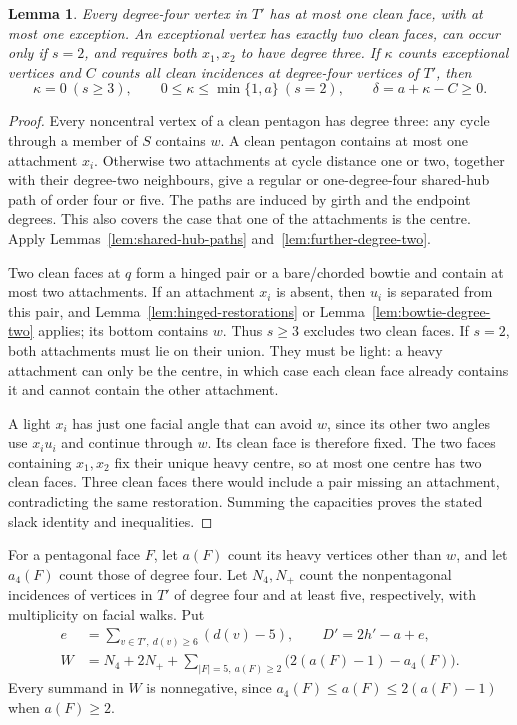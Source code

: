 \documentclass[11pt]{article}
\newtheorem{lemma}[theorem]{Lemma}
\theoremstyle{remark}
\numberwithin{equation}{section}
\numberwithin{table}{section}
\begin{document}
\begin{lemma}\label{lem:degree-two-clean-capacity}
Every degree-four vertex in $T'$ has at most one clean face, with
at most one exception. An exceptional vertex has exactly two clean
faces, can occur only if $s=2$, and requires both $x_1,x_2$ to have
degree three. If $\kappa$ counts exceptional vertices and $C$ counts
all clean incidences at degree-four vertices of $T'$, then
\begin{equation}\label{eq:degree-two-clean-slack}
 \kappa=0\ (s\ge3),\qquad 0\le\kappa\le\min\{1,a\}\ (s=2),\qquad
 \delta=a+\kappa-C\ge0.
\end{equation}
\end{lemma}
\begin{proof}
Every noncentral vertex of a clean pentagon has degree three: any
cycle through a member of $S$ contains $w$. A clean pentagon contains
at most one attachment $x_i$. Otherwise two attachments at cycle
distance one or two, together with their degree-two neighbours, give
a regular or one-degree-four shared-hub path of order four or five.
The paths are induced by girth and the endpoint degrees. This also
covers the case that one of the attachments is the centre. Apply
Lemmas~\ref{lem:shared-hub-paths} and~\ref{lem:further-degree-two}.

Two clean faces at $q$ form a hinged pair or a bare/chorded bowtie
and contain at most two attachments. If an attachment $x_i$ is absent,
then $u_i$ is separated from this pair, and
Lemma~\ref{lem:hinged-restorations} or
Lemma~\ref{lem:bowtie-degree-two} applies; its bottom contains $w$.
Thus $s\ge3$ excludes two clean faces. If $s=2$, both attachments
must lie on their union. They must be light: a heavy attachment can
only be the centre, in which case each clean face already contains
it and cannot contain the other attachment.

A light $x_i$ has just one facial angle that can avoid $w$, since its
other two angles use $x_i u_i$ and continue through $w$. Its clean
face is therefore fixed. The two faces containing $x_1,x_2$ fix their
unique heavy centre, so at most one centre has two clean faces. Three
clean faces there would include a pair missing an attachment,
contradicting the same restoration. Summing the capacities proves
the stated slack identity and inequalities.
\end{proof}

For a pentagonal face $F$, let $a(F)$ count its heavy vertices other
than $w$, and let $a_4(F)$ count those of degree four. Let $N_4,N_+$
count the nonpentagonal incidences of vertices in $T'$ of degree four
and at least five, respectively, with multiplicity on facial walks.
Put
\begin{align}
 e&=\sum_{v\in T',\ d(v)\ge6}(d(v)-5),\qquad
 D'=2h'-a+e,\label{eq:degree-two-degree-split}\\
 W&=N_4+2N_+
   +\sum_{|F|=5,\ a(F)\ge2}\bigl(2(a(F)-1)-a_4(F)\bigr).
 \label{eq:degree-two-weighted-slack}
\end{align}
Every summand in $W$ is nonnegative, since
$a_4(F)\le a(F)\le2(a(F)-1)$ when $a(F)\ge2$.
\end{document}
